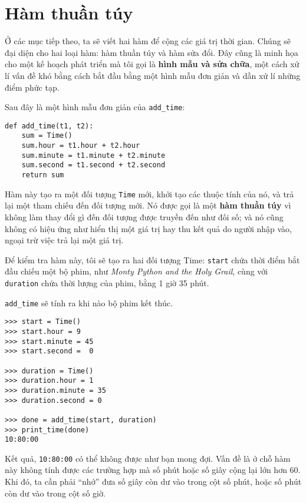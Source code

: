 \documentclass[11pt]{book}
\begin{document}
\section{Hàm thuần túy}


Ở các mục tiếp theo, ta sẽ viết hai hàm để cộng các giá trị thời gian.
Chúng sẽ đại diện cho hai loại hàm: hàm thuần túy và 
hàm sửa đổi. Đây cũng là minh họa cho một kế hoạch phát triển mà tôi gọi là {\bf
 hình mẫu và sửa chữa}, một cách xử lí vấn đề khó bằng cách 
bắt đầu bằng một hình mẫu đơn giản và dần xử lí những điểm phức tạp.

Sau đây là một hình mẫu đơn giản của \verb"add_time":

\beforeverb
\begin{verbatim}
def add_time(t1, t2):
    sum = Time()
    sum.hour = t1.hour + t2.hour
    sum.minute = t1.minute + t2.minute
    sum.second = t1.second + t2.second
    return sum
\end{verbatim}
\afterverb
%
Hàm này tạo ra một đối tượng {\tt Time} mới, khởi tạo các thuộc tính
của nó, và trả lại một tham chiếu đến đối tượng mới. Nó được gọi là
một {\bf hàm thuần túy} vì không làm thay đổi gì đến đối tượng được
truyền đến như đối số; và nó cũng không có hiệu ứng như hiển thị
một giá trị hay thu kết quả do người nhập vào, ngoại trừ việc trả lại
một giá trị.


Để kiểm tra hàm này, tôi sẽ tạo ra hai đối tượng Time: {\tt start}
chứa thời điểm bắt đầu chiếu một bộ phim, như {\em Monty Python and the
Holy Grail}, cùng với {\tt duration} chứa thời lượng của phim,
bằng 1 giờ 35 phút.


\verb"add_time" sẽ tính ra khi nào bộ phim kết thúc.

\beforeverb
\begin{verbatim}
>>> start = Time()
>>> start.hour = 9
>>> start.minute = 45
>>> start.second =  0

>>> duration = Time()
>>> duration.hour = 1
>>> duration.minute = 35
>>> duration.second = 0

>>> done = add_time(start, duration)
>>> print_time(done)
10:80:00
\end{verbatim}
\afterverb
%
Kết quả, {\tt 10:80:00} có thể không được như bạn mong đợi.
Vấn đề là ở chỗ hàm này không tính được các trường hợp mà số phút
hoặc số giây cộng lại lớn hơn 60. Khi đó, ta cần phải ``nhớ'' đưa số giây còn dư
vào trong cột số phút, hoặc số phút còn dư vào trong cột số giờ.
\end{document}
